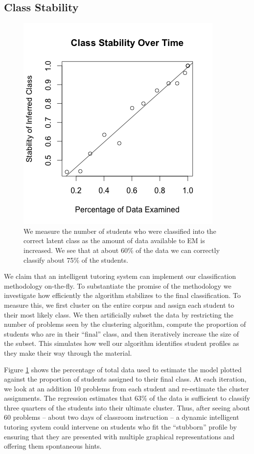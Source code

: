 \documentclass{edm_template}
\begin{document}
\subsection{Class Stability}

\begin{figure}
\includegraphics[scale=.6]{class-stability.png}
\caption{We measure the number of students who were classified into the correct latent class as the amount of data available to EM is increased. We see that at about 60\% of the data we can correctly classify about 75\% of the students.}
\label{fig:class-stability}
\end{figure}

We claim that an intelligent tutoring system can implement our classification methodology on-the-fly. To substantiate the promise of the methodology we investigate how efficiently the algorithm stabilizes to the final classification. To measure this, we first cluster on the entire corpus and assign each student to their most likely class. We then artificially subset the data by restricting the number of problems seen by the clustering algorithm, compute the proportion of students who are in their ``final'' class, and then iteratively increase the size of the subset. This simulates how well our algorithm identifies student profiles as they make their way through the material. 

Figure \ref{fig:class-stability} shows the percentage of total data used to estimate the model plotted against the proportion of students assigned to their final class. At each iteration, we look at an addition 10 problems from each student and re-estimate the cluster assignments. The regression estimates that 63\% of the data is sufficient to classify three quarters of the students into their ultimate cluster. Thus, after seeing about 60 problems -- about two days of classroom instruction -- a dynamic intelligent tutoring system could intervene on students who fit the ``stubborn'' profile by ensuring that they are presented with multiple graphical representations and offering them spontaneous hints. 
\end{document}
